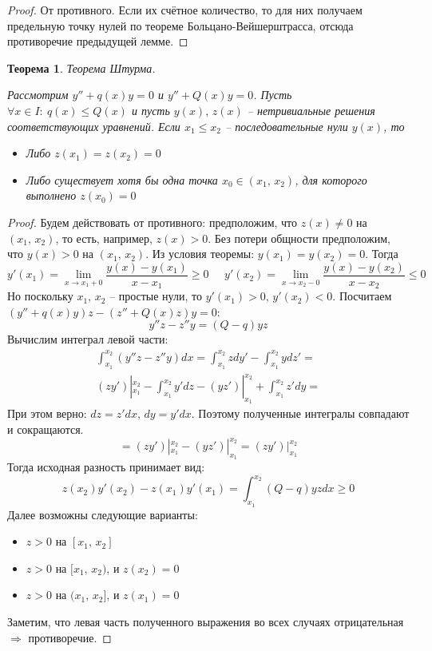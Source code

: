 \documentclass[a4paper,12pt]{article}
\renewcommand{\leq}{\ensuremath{\leqslant}}
\renewcommand{\geq}{\ensuremath{\geqslant}}
\theoremstyle{plain}
\newtheorem{theorem}{Теорема}[section]
\theoremstyle{definition}
\theoremstyle{remark}
\begin{document}
\begin{proof}
	От противного. Если их счётное количество, то для них получаем предельную точку нулей по теореме Больцано-Вейшерштрасса, отсюда противоречие предыдущей лемме.
\end{proof}

\begin{theorem}
	Теорема Штурма.

	Рассмотрим $y'' + q(x)y = 0$ и $y'' + Q(x)y = 0$. Пусть $\forall x \in I:\: q(x) \leq Q(x)$ и пусть $y(x),\,z(x)$ -- нетривиальные решения соответствующих уравнений. Если $x_1 \leq x_2$ -- последовательные нули $y(x)$, то
	\begin{itemize}
		\item Либо $z(x_1) = z(x_2) = 0$
		\item Либо существует хотя бы одна точка $x_0 \in (x_1,\,x_2)$, для которого выполнено $z(x_0) = 0$
	\end{itemize}
\end{theorem}

\begin{proof}
	Будем действовать от противного: предположим, что $z(x) \neq 0$ на $(x_1,\,x_2)$, то есть, например, $z(x) > 0$. Без потери общности предположим, что $y(x) > 0$ на $(x_1,\,x_2)$. Из условия теоремы: $y(x_1) = y(x_2) = 0$. Тогда
	\[y'(x_1) = \lim_{x \to x_1 + 0} \frac{y(x) - y(x_1)}{x - x_1} \geq 0\;\;\;\;\; y'(x_2) = \lim_{x \to x_2 - 0} \frac{y(x) - y(x_2)}{x - x_2} \leq 0\]
	Но поскольку $x_1,\,x_2$ -- простые нули, то $y'(x_1) > 0,\, y'(x_2) < 0$. Посчитаем $(y'' + q(x)y)z - (z'' + Q(x)z)y = 0$:
	\[y''z - z''y = (Q - q)yz\]
	Вычислим интеграл левой части:
	\begin{align*}
		\int_{x_1}^{x_2}(y''z - z''y)dx = \int_{x_1}^{x_2}zdy' - \int_{x_1}^{x_2}ydz' = \\
		(zy')|_{x_1}^{x_2} - \int_{x_1}^{x_2}y'dz - (yz')|_{x_1}^{x_2} + \int_{x_1}^{x_2}z'dy =
	\end{align*}
	При этом верно: $dz = z'dx,\, dy = y'dx$. Поэтому полученные интегралы совпадают и сокращаются.
	\[= (zy')|_{x_1}^{x_2} - (yz')|_{x_1}^{x_2} = (zy')|_{x_1}^{x_2}\]
	Тогда исходная разность принимает вид:
	\[z(x_2)y'(x_2) - z(x_1)y'(x_1) = \int_{x_1}^{x_2}(Q - q)yzdx \geq 0\]
	Далее возможны следующие варианты:
	\begin{itemize}
		\item $z > 0$ на $[x_1,\,x_2]$
		\item $z > 0$ на $[x_1,\,x_2)$, и $z(x_2) = 0$
		\item $z > 0$ на $(x_1,\,x_2]$, и $z(x_1) = 0$
	\end{itemize}
	Заметим, что левая часть полученного выражения во всех случаях отрицательная $\Rightarrow$ противоречие.
\end{proof}
\end{document}
